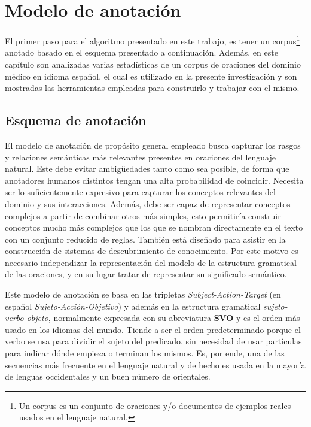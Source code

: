 \chapter{Modelo de anotación}\label{chapter:annotation_model}
El primer paso para el algoritmo presentado en este trabajo, es tener un corpus\footnote{Un corpus es un conjunto de oraciones y/o documentos de ejemplos reales usados en el lenguaje natural.} anotado basado en el esquema presentado a continuación. Además, en este capítulo son analizadas varias estadísticas de un corpus de oraciones del dominio médico en idioma español, el cual es utilizado en la presente investigación y son mostradas las herramientas empleadas para construirlo y trabajar con el mismo.


\section{Esquema de anotación}
\label{section:annotation_structure}
El modelo de anotación de propósito general empleado busca capturar los rasgos y relaciones semánticas más relevantes presentes en oraciones del lenguaje natural. Este debe evitar ambigüedades tanto como sea posible, de forma que anotadores humanos distintos tengan una alta probabilidad de coincidir. Necesita ser lo suficientemente expresivo para capturar los conceptos relevantes del dominio y sus interacciones. Además, debe ser capaz de representar conceptos complejos a partir de combinar otros más simples, esto permitiría construir conceptos mucho más complejos que los que se nombran directamente en el texto con un conjunto reducido de reglas. También está diseñado para asistir en la construcción de sistemas de descubrimiento de conocimiento. Por este motivo es necesario independizar la representación del modelo de la estructura gramatical de las oraciones, y en su lugar tratar de representar su significado semántico.

Este modelo de anotación se basa en las tripletas \textit{Subject-Action-Target} (en español \textit{Sujeto-Acción-Objetivo}) y además en la estructura gramatical \textit{sujeto-verbo-objeto}, normalmente expresada con su abreviatura \textbf{SVO} y es el orden más usado en los idiomas del mundo. Tiende a ser el orden predeterminado porque el verbo se usa para dividir el sujeto del predicado, sin necesidad de usar partículas para indicar dónde empieza o terminan los mismos. Es, por ende, una de las secuencias más frecuente en el lenguaje natural y de hecho es usada en la mayoría de lenguas occidentales y un buen número de orientales.


